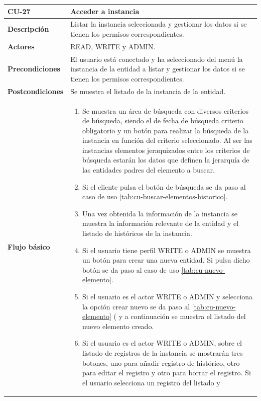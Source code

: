 \begin{table} [H]
    \centering
    \setlength{\leftmargini}{0.4cm}
	\resizebox{14cm}{!} { %
    \begin{tabular}{| m{3cm} | m{11cm} |}   
    \hline
	  \textbf{CU-27} & \textbf{Acceder a instancia} \\\hline
	  \textbf{Descripción} & Listar la instancia seleccionada y gestionar los datos si se tienen los permisos correspondientes. \\\hline
	  \textbf{Actores} & READ, WRITE y ADMIN. \\\hline
	  \textbf{Precondiciones} & El usuario está conectado y ha seleccionado del menú la instancia de la entidad a listar y gestionar los datos si se tienen los permisos correspondientes. \\\hline
	  \textbf{Postcondiciones} & Se muestra el listado de la instancia de la entidad. \\\hline
	  \textbf{Flujo básico} & 
		\begin{enumerate}
	  	\item Se muestra un área de búsqueda con diversos criterios de búsqueda, siendo el de fecha de búsqueda criterio obligatorio y un botón para realizar la búsqueda de la instancia en función del criterio seleccionado. Al ser las instancias elementos jeraquizados entre los criterios de búsqueda estarán los datos que definen la jerarquía de las entidades padres del elemento a buscar.
	  	\item Si el cliente pulsa el botón de búsqueda se da paso al caso de uso \ref{tab:cu-buscar-elementos-historico}. 
	  	\item Una vez obtenida la información de la instancia se muestra la información relevante de la entidad y el listado de históricos de la instancia.
	  	\item Si el usuario tiene perfil WRITE o ADMIN se muestra un botón para crear una nueva entidad. Si pulsa dicho botón se da paso al caso de uso \ref{tab:cu-nuevo-elemento}.
	  	\item Si el usuario es el actor WRITE o ADMIN y selecciona la opción crear nuevo se da paso al \ref{tab:cu-nuevo-elemento} (\pageref{tab:cu-nuevo-elemento} y a continuación se muestra el listado del nuevo elemento creado.
		\item Si el usuario es el actor WRITE o ADMIN, sobre el listado de registros de la instancia se mostrarán tres botones, uno para añadir registro de histórico, otro para editar el registro y otro para borrar el registro. Si el usuario selecciona un registro del listado y

\end{enumerate}
\end{tabular}}
\end{table}
